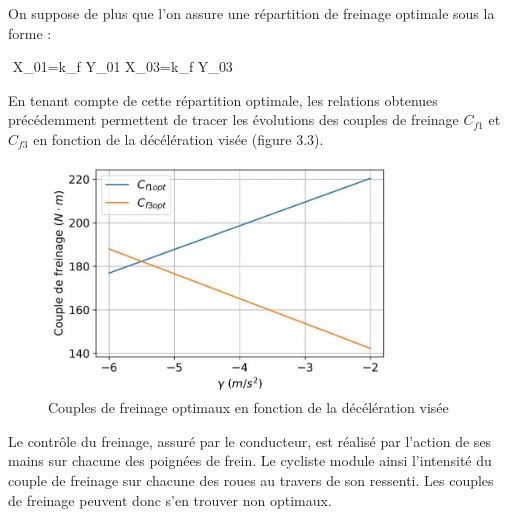 {{On suppose de plus que l'on assure une répartition de freinage optimale sous la forme :

\(\)
X_{01}=k_{f} \cdot Y_{01} \quad {} \quad X_{03}=k_{f} \cdot Y_{03}
\(\)

En tenant compte de cette répartition optimale, les relations obtenues précédemment permettent de tracer les évolutions des couples de freinage \(C_{f 1}\) et \(C_{f 3}\) en fonction de la décélération visée (figure 3.3).\\

\begin{figure}[!htb]
\begin{center}
\includegraphics[width=0.8\textwidth]{images/2024_12_06_8b2ce2e701dae8972925g-11}
\caption{Couples de freinage optimaux en fonction de la décélération visée \label{fig6}}
\end{center}
\end{figure}



Le contrôle du freinage, assuré par le conducteur, est réalisé par l'action de ses mains sur chacune des poignées de frein. Le cycliste module ainsi l'intensité du couple de freinage sur chacune des roues au travers de son ressenti. Les couples de freinage peuvent donc s'en trouver non optimaux.


}}
